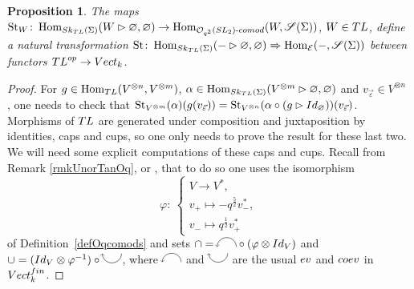 \documentclass[11pt]{article}
\numberwithin{equation}{section}
\numberwithin{equation}{section}
\newtheorem{Proposition}[Theorem]{Proposition}
 { \theoremstyle{definition}
\newtheorem{Definition}[Theorem]{Definition}
\newtheorem{Note}[Theorem]{Note}
\newtheorem{Example}[Theorem]{Example}
\newtheorem{Remark}[Theorem]{Remark} }
\newcommand{\lcap}{\tikz[scale = 0.3] \draw[<-] (0,0) arc(180:0:1);}
\newcommand{\lcup}{\tikz[scale = 0.3] \draw[<-] (0,0) arc(-180:0:1);}
\newcommand{\St}{\operatorname{St}}
\newcommand{\Hom}{\operatorname{Hom}}
\newcommand{\Oq}{\mathcal{O}_{q^2}({\rm SL}_2)}
\begin{document}
\begin{Proposition}\label{propStNat}
The maps $\St_W \colon \Hom_{{\rm Sk}_{{\rm TL}}(\Sigma)}(W\rhd \varnothing,\varnothing) \to \Hom_{\Oq\text{-}{\rm comod}}(W, \mathscr{S}(\Sigma))$, $W \in {\rm TL}$, define a natural transformation $\St\colon \Hom_{{\rm Sk}_{{\rm TL}}(\Sigma)}(-\rhd \varnothing,\varnothing) \Rightarrow \Hom_{\mathcal{E}}(-, \mathscr{S}(\Sigma))$ between functors ${\rm TL}^{\rm op}\to {\rm Vect}_k$.
\end{Proposition}
\begin{proof}
For $g \in \Hom_{{\rm TL}}(V^{\otimes n},V^{\otimes m})$, $\alpha \in \Hom_{{\rm Sk}_{{\rm TL}}(\Sigma)}(V^{\otimes m}\rhd \varnothing,\varnothing)$ and $v_{\vec{\varepsilon}} \in V^{\otimes n}$
, one needs to check that $\St_{V^{\otimes m}}(\alpha)(g(v_{\vec{\varepsilon}})) = \St_{V^{\otimes n}}(\alpha \circ (g\rhd {\rm Id}_\varnothing))(v_{\vec{\varepsilon}})$. Morphisms of ${\rm TL}$ are generated under composition and juxtaposition by identities, caps and cups, so one only needs to prove the result for these last two.
We will need some explicit computations of these caps and cups. Recall from Remark \ref{rmkUnorTanOq}, or \cite[Theorem~4.2]{Tingley}, that to do so one uses the isomorphism
\[
\varphi \colon\ \begin{cases}
V \to V^*,
\\
v_+ \mapsto -q^{\frac{5}{2}} v_-^*,
\\ v_- \mapsto q^{\frac{1}{2}}v_+^*\end{cases}
\]
 of Definition~\ref{defOqcomods} and sets $\cap = \lcap \circ (\varphi \otimes {\rm Id}_V)$ and $\cup = ({\rm Id}_V \otimes \varphi^{-1})\circ \lcup$, where $\lcap$ and $\lcup$ are the usual ${\rm ev}$ and ${\rm coev}$ in ${\rm Vect}_k^{\rm fin}$.


\end{proof}
\end{document}

